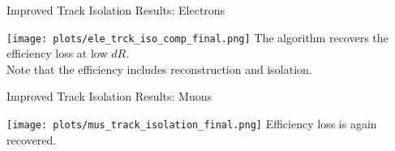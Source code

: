 \documentclass{beamer}
\begin{document}
\begin{frame}{Improved Track Isolation Results: Electrons}
  \begin{center}

    \vspace{-0.2cm}
    \texttt{[image: plots/ele\_trck\_iso\_comp\_final.png]}
    \vspace{-0.1cm}
    The algorithm recovers the efficiency loss at low $dR$.\\Note that the efficiency includes reconstruction and isolation.
  \end{center}
\end{frame}


\begin{frame}{Improved Track Isolation Results: Muons}%
  \begin{center}
    \vspace{-0.2cm}
    \texttt{[image: plots/mus\_track\_isolation\_final.png]}
    \vspace{-0.1cm}
    Efficiency loss is again recovered.
  \end{center}
\end{frame}
\end{document}
